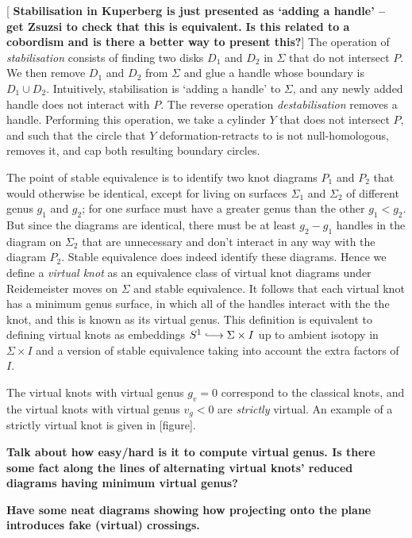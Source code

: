 \documentclass[12pt]{report}
\newcommand{\notered}[1]{{\color{Red} \textbf{#1}}}
\newcommand{\notegreen}[1]{{\color{Green} \textbf{#1}}}
\begin{document}
[\notegreen{Stabilisation in Kuperberg is just presented as `adding a handle' -- get Zsuzsi to check that this is equivalent.} \notered{Is this related to a cobordism and is there a better way to present this?}] The operation of \textit{stabilisation} consists of finding two disks $D_{1}$ and $D_{2}$ in $\Sigma$ that do not intersect $P$. We then remove $D_{1}$ and $D_{2}$ from $\Sigma$ and glue a handle whose boundary is $D_{1} \cup D_{2}$. Intuitively, stabilisation is `adding a handle' to $\Sigma$, and any newly added handle does not interact with $P$. The reverse operation \textit{destabilisation} removes a handle. Performing this operation, we take a cylinder $Y$ that does not intersect $P$, and such that the circle that $Y$ deformation-retracts to is not null-homologous, removes it, and cap both resulting boundary circles.

The point of stable equivalence is to identify two knot diagrams $P_{1}$ and $P_{2}$ that would otherwise be identical, except for living on surfaces $\Sigma_{1}$ and $\Sigma_{2}$ of different genus $g_{1}$ and $g_{2}$; for one surface must have a greater genus than the other $g_{1} < g_{2}$. But since the diagrams are identical, there must be at least $g_{2} - g_{1}$ handles in the diagram on $\Sigma_{2}$ that are unnecessary and don't interact in any way with the diagram $P_{2}$. Stable equivalence does indeed identify these diagrams. Hence we define a \textit{virtual knot} as an equivalence class of virtual knot diagrams under Reidemeister moves on $\Sigma$ and stable equivalence. It follows that each virtual knot has a minimum genus surface, in which all of the handles interact with the the knot, and this is known as its virtual genus. This definition is equivalent to defining virtual knots as embeddings $S^{1} \lhook\joinrel\longrightarrow \Sigma \times I$ up to ambient isotopy in $\Sigma \times I$ and a version of stable equivalence taking into account the extra factors of $I$.

The virtual knots with virtual genus $g_{v} = 0$ correspond to the classical knots, and the virtual knots with virtual genus $v_{g} < 0$ are \textit{strictly} virtual. An example of a strictly virtual knot is given in [figure].

\notered{Talk about how easy/hard is it to compute virtual genus. Is there some fact along the lines of alternating virtual knots' reduced diagrams having minimum virtual genus?}

\notegreen{Have some neat diagrams showing how projecting onto the plane introduces fake (virtual) crossings.}
\end{document}
